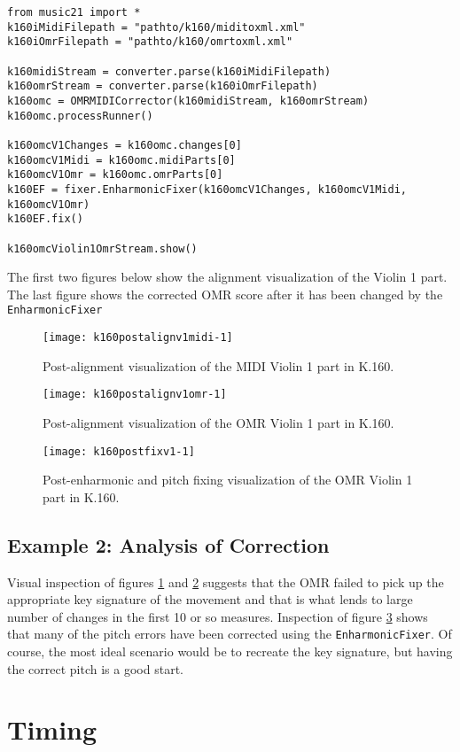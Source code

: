 \begin{verbatim}
from music21 import *
k160iMidiFilepath = "pathto/k160/miditoxml.xml"
k160iOmrFilepath = "pathto/k160/omrtoxml.xml"
         
k160midiStream = converter.parse(k160iMidiFilepath)
k160omrStream = converter.parse(k160iOmrFilepath)
k160omc = OMRMIDICorrector(k160midiStream, k160omrStream)
k160omc.processRunner()
        
k160omcV1Changes = k160omc.changes[0]
k160omcV1Midi = k160omc.midiParts[0]
k160omcV1Omr = k160omc.omrParts[0]
k160EF = fixer.EnharmonicFixer(k160omcV1Changes, k160omcV1Midi, k160omcV1Omr)
k160EF.fix()

k160omcViolin1OmrStream.show()
\end{verbatim}

The first two figures below show the alignment visualization of the Violin 1 part. The last figure shows the corrected OMR score after it has been changed by the \texttt{EnharmonicFixer}

\begin{figure}[H]
\centering
\texttt{[image: k160postalignv1midi-1]}
\caption{Post-alignment visualization of the MIDI Violin 1 part in K.160.}
\label{fig:k160postalignv1midi}
\end{figure}

\begin{figure}[H]
\centering
\texttt{[image: k160postalignv1omr-1]}
\caption{Post-alignment visualization of the OMR Violin 1 part in K.160.}
\label{fig:k160postalignv1omr}
\end{figure}

\begin{figure}[H]
\centering
\texttt{[image: k160postfixv1-1]}
\caption{Post-enharmonic and pitch fixing visualization of the OMR Violin 1 part in K.160.}
\label{fig:k160postfixv1}
\end{figure}

\subsection{Example 2: Analysis of Correction}
Visual inspection of figures \ref{fig:k160postalignv1midi} and \ref{fig:k160postalignv1omr} suggests that the OMR failed to pick up the appropriate key signature of the movement and that is what lends to large number of changes in the first 10 or so measures. Inspection of figure \ref{fig:k160postfixv1} shows that many of the pitch errors have been corrected using the \texttt{EnharmonicFixer}. Of course, the most ideal scenario would be to recreate the key signature, but having the correct pitch is a good start. 

\section{Timing} \label{timing}

